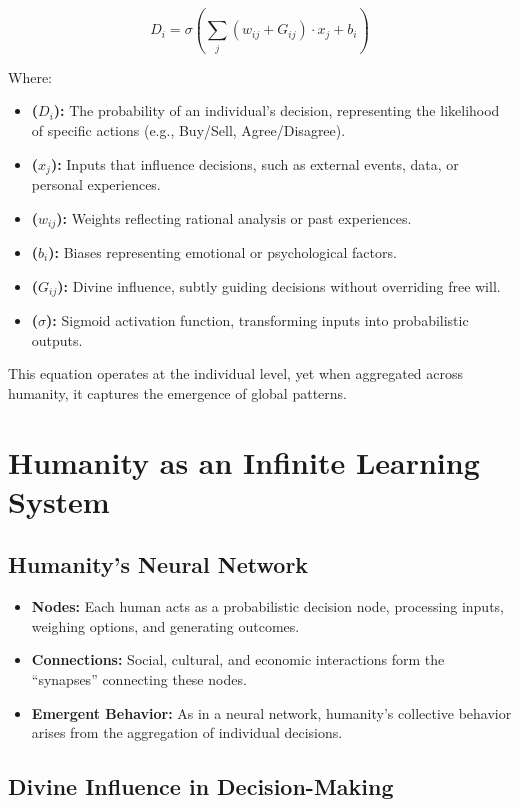 \documentclass[a4]{article}
\begin{document}
$$D_i = \sigma \left(\sum_{j} (w_{ij} + G_{ij}) \cdot x_j + b_i \right)$$  

Where: 

\begin{itemize}
\item {\bf ($D_i$):} The probability of an individual's decision, representing the likelihood of specific actions (e.g., Buy/Sell, Agree/Disagree).  
\item  {\bf ($x_j$):} Inputs that influence decisions, such as external events, data, or personal experiences.  
\item {\bf ($w_{ij}$):} Weights reflecting rational analysis or past experiences.  
\item {\bf ($b_i$):} Biases representing emotional or psychological factors.  
\item {\bf ($G_{ij}$):} Divine influence, subtly guiding decisions without overriding free will.  
\item {\bf ($\sigma$):} Sigmoid activation function, transforming inputs into probabilistic outputs.  
\end{itemize}

This equation operates at the individual level, yet when aggregated across humanity, it captures the emergence of global patterns.


\section{Humanity as an Infinite Learning System}

\subsection{Humanity's Neural Network}

\begin{itemize}
\item  {\bf Nodes:} Each human acts as a probabilistic decision node, processing inputs, weighing options, and generating outcomes.  
\item  {\bf Connections:} Social, cultural, and economic interactions form the ``synapses'' connecting these nodes.  
\item {\bf Emergent Behavior:} As in a neural network, humanity's collective behavior arises from the aggregation of individual decisions.  
\end{itemize}

\subsection{Divine Influence in Decision-Making}
\end{document}
